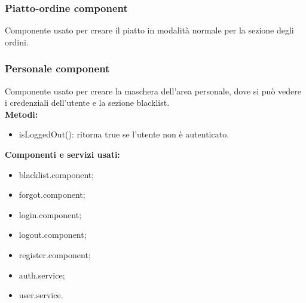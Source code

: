 
\subsubsection{Piatto-ordine component}
Componente usato per creare il piatto in modalità normale per la sezione degli ordini.\\

\subsubsection{Personale component}
Componente usato per creare la maschera dell'area personale, dove si può vedere i credenziali dell'utente e la sezione blacklist.\\
\textbf{Metodi:}
\begin{itemize}
    \item isLoggedOut(): ritorna true se l'utente non è autenticato.
\end{itemize}
\textbf{Componenti e servizi usati:}
\begin{itemize}
    \item blacklist.component;
    \item forgot.component;
    \item login.component;
    \item logout.component;
    \item register.component;
    \item auth.service;
    \item user.service.
\end{itemize}

